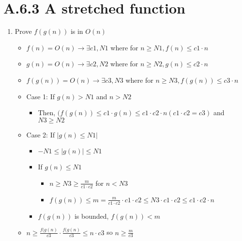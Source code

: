 \documentclass[12pt]{article}
\begin{document}
\section*{A.6.3 A stretched function}
\begin{enumerate}
  \item[] Prove $f(g(n))$ is in $O(n)$
    \begin{itemize}
      \item $f(n) = O(n) \rightarrow \exists c1, N1$ where for $n\geq N1, f(n) \leq c1\cdot n$
      \item $g(n) = O(n) \rightarrow \exists c2, N2$ where for $n\geq N2, g(n) \leq c2\cdot n$
      \item $f(g(n)) = O(n) \rightarrow \exists c3, N3$ where for $n\geq N3, f(g(n))\leq c3\cdot n$
      \item Case 1: If $g(n) > N1$ and $n > N2$
        \begin{itemize}
          \item Then, $(f(g(n)) \leq c1\cdot g(n) \leq c1 \cdot c2 \cdot n (c1\cdot c2 = c3)$ and $N3 \geq N2$
        \end{itemize}
      \item Case 2: If $|g(n) \leq N1|$
        \begin{itemize}
          \item $-N1 \leq |g(n)| \leq N1$
          \item If $g(n) \leq N1$
            \begin{itemize}
              \item $n\geq N3\geq \frac{m}{c1\cdot c2}$ for $n < N3$
              \item $f(g(n)) \leq m = \frac{m}{c1\cdot c2} \cdot c1 \cdot c2 \leq N3 \cdot c1 \cdot c2 \leq c1 \cdot c2 \cdot n$
            \end{itemize}
          \item $f(g(n))$ is bounded, $f(g(n)) < m$
        \end{itemize}
      \item $n \geq \frac{f(g(n)}{c3} \cdot \frac {f(g(n)}{c3} \leq n\cdot c3$ so $n \geq \frac{m}{c3}$
    \end{itemize}
\end{enumerate}
\end{document}

